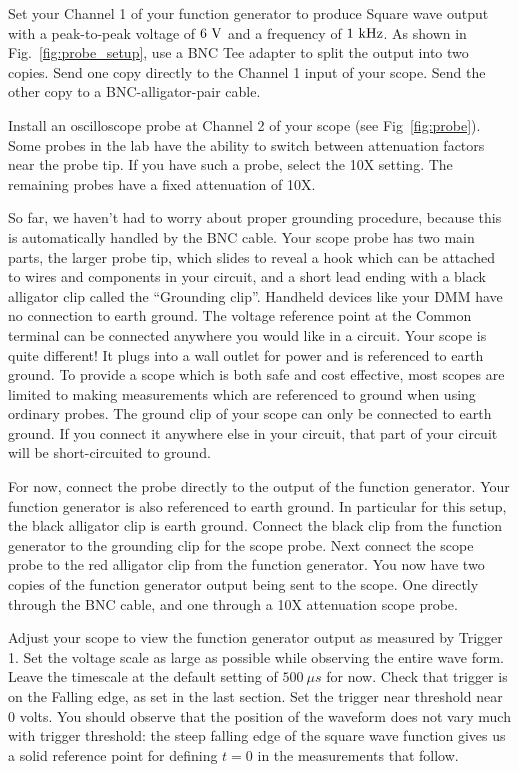 Set your Channel 1 of your function generator to produce Square wave
output with a peak-to-peak voltage of $6~\rm V$ and a frequency of
$1~\rm kHz$.  As shown in Fig.~\ref{fig:probe_setup}, use a BNC Tee adapter
to split the output into two copies.  Send one copy directly to the
Channel 1 input of your scope.  Send the other copy to a
BNC-alligator-pair cable.  

Install an oscilloscope probe at Channel 2 of your scope (see Fig~\ref{fig:probe}).  Some probes
in the lab have the ability to switch between attenuation factors near
the probe tip.  If you have such a probe, select the 10X setting.  The
remaining probes have a fixed attenuation of 10X.

So far, we haven't had to worry about proper grounding procedure,
because this is automatically handled by the BNC cable.  Your scope
probe has two main parts, the larger probe tip, which slides to reveal
a hook which can be attached to wires and components in your circuit,
and a short lead ending with a black alligator clip called the
``Grounding clip''.  Handheld devices like your DMM have no connection
to earth ground.  The voltage reference point at the Common terminal
can be connected anywhere you would like in a circuit.  Your scope is
quite different!  It plugs into a wall outlet for power and is
referenced to earth ground.  To provide a scope which is both safe and
cost effective, most scopes are limited to making measurements which
are referenced to ground when using ordinary probes.  The ground clip
of your scope can only be connected to earth ground.  If you connect
it anywhere else in your circuit, that part of your circuit will be
short-circuited to ground.

For now, connect the probe directly to the output of the
function generator.  Your function generator is also referenced to
earth ground.  In particular for this setup, the black alligator clip
is earth ground.  Connect the black clip from the function generator
to the grounding clip for the scope probe.  Next connect the scope
probe to the red alligator clip from the function generator.  You now
have two copies of the function generator output being sent to the
scope.  One directly through the BNC cable, and one through a 10X
attenuation scope probe.

Adjust your scope to view the function generator output as measured by
Trigger 1.  Set the voltage scale as large as possible while observing
the entire wave form.  Leave the timescale at the default setting of
$500~\mu s$ for now.  Check that trigger is on the Falling edge, as set
in the last section.  Set the trigger near threshold near 0 volts.
You should observe that the position of the waveform does not vary
much with trigger threshold: the steep falling edge of the square wave
function gives us a solid reference point for defining $t=0$ in the
measurements that follow.

